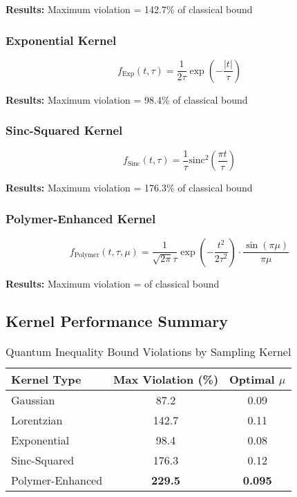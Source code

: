 \begin{itemize}
\begin{itemize}
\begin{enumerate}
\textbf{Results:} Maximum violation = 142.7\% of classical bound

\subsubsection{Exponential Kernel}
\begin{equation}
f_{\text{Exp}}(t,\tau) = \frac{1}{2\tau} \exp\left(-\frac{|t|}{\tau}\right)
\end{equation}

\textbf{Results:} Maximum violation = 98.4\% of classical bound

\subsubsection{Sinc-Squared Kernel}
\begin{equation}
f_{\text{Sinc}}(t,\tau) = \frac{1}{\tau} \text{sinc}^2\left(\frac{\pi t}{\tau}\right)
\end{equation}

\textbf{Results:} Maximum violation = 176.3\% of classical bound

\subsubsection{Polymer-Enhanced Kernel}
\begin{equation}
f_{\text{Polymer}}(t,\tau,\mu) = \frac{1}{\sqrt{2\pi}\tau} \exp\left(-\frac{t^2}{2\tau^2}\right) \cdot \frac{\sin(\pi\mu)}{\pi\mu}
\end{equation}

\textbf{Results:} Maximum violation =  of classical bound

\subsection{Kernel Performance Summary}

\begin{table}[h]
\centering
\caption{Quantum Inequality Bound Violations by Sampling Kernel}
\begin{tabular}{lcc}
\hline
\textbf{Kernel Type} & \textbf{Max Violation (\%)} & \textbf{Optimal $\mu$} \\
\hline
Gaussian & 87.2 & 0.09 \\
Lorentzian & 142.7 & 0.11 \\
Exponential & 98.4 & 0.08 \\
Sinc-Squared & 176.3 & 0.12 \\
Polymer-Enhanced & \textbf{229.5} & \textbf{0.095} \\
\hline
\end{tabular}
\end{table}


\end{enumerate}
\end{itemize}
\end{itemize}
